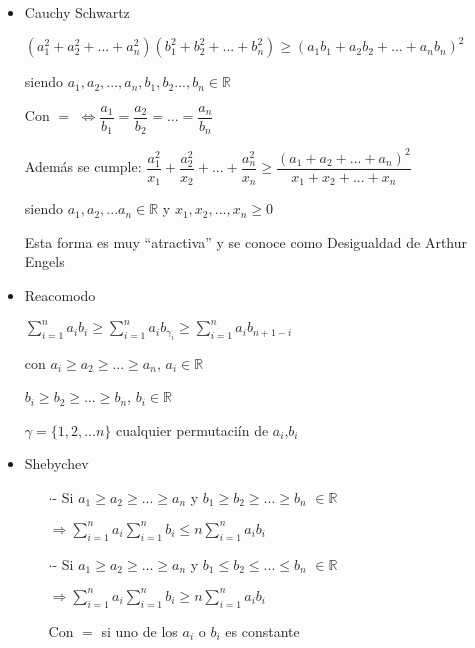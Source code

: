 \begin{itemize}
    \item Cauchy Schwartz \vspace{-0.3cm}
    \item[] $(a_1^2+a_2^2+...+a_n^2)(b_1^2+b_2^2+...+b_n^2)\ge (a_1b_1+a_2b_2+...+a_nb_n)^2$ \vspace{-0.2cm}
    \item[] siendo $a_1,a_2,...,a_n,b_1,b_2...,b_n \in \mathbb{R}$ \vspace{-0.2cm}
    \item[] Con $=$ $\Longleftrightarrow \dfrac{a_1}{b_1}=\dfrac{a_2}{b_2}=...=\dfrac{a_n}{b_n}$ \vspace{-0.2cm}
    \item[] Además se cumple: $\dfrac{a_1^2}{x_1}+\dfrac{a_2^2}{x_2}+...+\dfrac{a_n^2}{x_n} \ge \dfrac{(a_1+a_2+...+a_n)^2}{x_1+x_2+...+x_n}$ \vspace{-0.2cm}
    \item[] siendo $a_1,a_2,...a_n \in \mathbb{R}$ y $x_1,x_2,...,x_n \ge 0$ \vspace{-0.2cm}
    \item[] Esta forma es muy ``atractiva'' y se conoce como Desigualdad de Arthur Engels
    
    \item Reacomodo \vspace{-0.2cm}
    \item[] $\sum\limits_{i=1}^{n}{a_ib_i} \ge \sum\limits_{i=1}^{n}{a_ib_{\gamma_i}} \ge \sum\limits_{i=1}^{n}{a_ib_{n+1-i}}$ \vspace{-0.1cm}
    \item[] con $a_i \ge a_2 \ge ... \ge a_n$, $a_i \in \mathbb{R}$ \vspace{-0.1cm}
    \item[]    $b_i \ge b_2 \ge ... \ge b_n$, $b_i \in \mathbb{R}$ \vspace{-0.1cm}
    \item[] $\gamma = \{1,2,...n\}$ cualquier permutaciín de $a_i$,$b_i$
    
    \item Shebychev \vspace{-0.2cm}
      \begin{itemize}
        \addtolength{\itemindent}{0.5cm}
        \item[$\cdot\text{-}$] Si $a_1 \ge a_2 \ge ... \ge a_n$ y $b_1 \ge b_2 \ge ... \ge b_n$ $\in \mathbb{R}$
        \item[] \hspace{0.3cm} $\Longrightarrow \sum\limits_{i=1}^{n}{a_i} \sum\limits_{i=1}^{n}{b_i} \le n \sum\limits_{i=1}^{n}{a_ib_i}$
        \item[$\cdot\text{-}$] Si $a_1 \ge a_2 \ge ... \ge a_n$ y $b_1 \le b_2 \le ... \le b_n$ $\in \mathbb{R}$
        \item[] \hspace{0.3cm} $\Longrightarrow \sum\limits_{i=1}^{n}{a_i} \sum\limits_{i=1}^{n}{b_i} \ge n \sum\limits_{i=1}^{n}{a_ib_i}$
        \item[] Con $=$ si uno de los $a_i$ o $b_i$ es constante
    \end{itemize}
    

\end{itemize}
